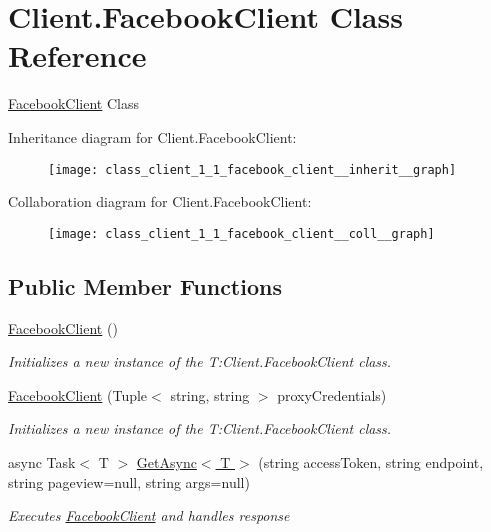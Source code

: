 \hypertarget{class_client_1_1_facebook_client}{}\section{Client.\+Facebook\+Client Class Reference}
\label{class_client_1_1_facebook_client}


\hyperlink{class_client_1_1_facebook_client}{Facebook\+Client} Class  




Inheritance diagram for Client.\+Facebook\+Client\+:
\nopagebreak
\begin{figure}[H]
\begin{center}
\leavevmode
\texttt{[image: class\_client\_1\_1\_facebook\_client\_\_inherit\_\_graph]}
\end{center}
\end{figure}


Collaboration diagram for Client.\+Facebook\+Client\+:
\nopagebreak
\begin{figure}[H]
\begin{center}
\leavevmode
\texttt{[image: class\_client\_1\_1\_facebook\_client\_\_coll\_\_graph]}
\end{center}
\end{figure}
\subsection*{Public Member Functions}
\begin{DoxyCompactItemize}
\item 
\hyperlink{class_client_1_1_facebook_client_a52bc1884b4af1ab80f9b0c780991dc55}{Facebook\+Client} ()
\begin{DoxyCompactList}\small\item\em Initializes a new instance of the T\+:\+Client.\+Facebook\+Client class. \end{DoxyCompactList}\item 
\hyperlink{class_client_1_1_facebook_client_abd40548eb3ac73cbb0755c4ab25fa46f}{Facebook\+Client} (Tuple$<$ string, string $>$ proxy\+Credentials)
\begin{DoxyCompactList}\small\item\em Initializes a new instance of the T\+:\+Client.\+Facebook\+Client class. \end{DoxyCompactList}\item 
async Task$<$ T $>$ \hyperlink{class_client_1_1_facebook_client_aa8feb74481610d6e45da94798656adca}{Get\+Async$<$ T $>$} (string access\+Token, string endpoint, string pageview=null, string args=null)
\begin{DoxyCompactList}\small\item\em Executes \hyperlink{class_client_1_1_facebook_client}{Facebook\+Client} and handles response \end{DoxyCompactList}\end{DoxyCompactItemize}


